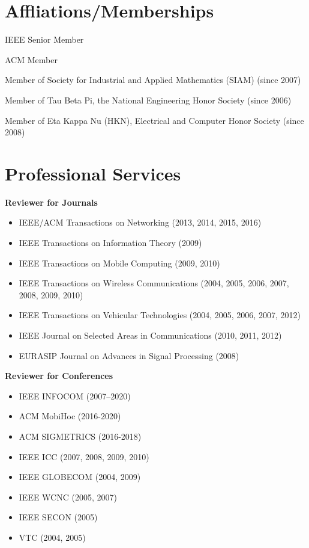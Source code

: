 \documentclass[overlapped,line,letterpaper]{res1}
\begin{document}
\begin{resume}
\begin{enumerate}
\end{enumerate}



\section{\bf \large Affliations/Memberships}
\vspace{.1in} IEEE Senior Member

\vspace{-.1in} ACM Member

\vspace{-.1in} Member of Society for Industrial and Applied Mathematics (SIAM) (since 2007)

\vspace{-.1in} Member of Tau Beta Pi, the National Engineering Honor Society (since 2006)

\vspace{-.1in} Member of Eta Kappa Nu (HKN), Electrical and Computer Honor Society (since 2008)

\section{\bf \large Professional Services}
\vspace{.16in}
\hspace{-.55in} {\bf Reviewer for Journals}
\vspace{.16in}
\begin{itemize}
\item IEEE/ACM Transactions on Networking (2013, 2014, 2015, 2016)
\item IEEE Transactions on Information Theory (2009)
\item IEEE Transactions on Mobile Computing (2009, 2010)
\item IEEE Transactions on Wireless Communications (2004, 2005, 2006, 2007, 2008, 2009, 2010)
\item IEEE Transactions on Vehicular Technologies (2004, 2005, 2006, 2007, 2012)
\item IEEE Journal on Selected Areas in Communications (2010, 2011, 2012)
\item EURASIP Journal on Advances in Signal Processing (2008)
\end{itemize}

\hspace{-.55in} {\bf Reviewer for Conferences}
\vspace{.16in}
\begin{itemize}
\item IEEE INFOCOM (2007--2020)
\item ACM MobiHoc (2016-2020)
\item ACM SIGMETRICS (2016-2018)
\item IEEE ICC (2007, 2008, 2009, 2010)
\item IEEE GLOBECOM (2004, 2009)
\item IEEE WCNC (2005, 2007)
\item IEEE SECON (2005)
\item VTC (2004, 2005)
\end{itemize}



\end{resume}
\end{document}
